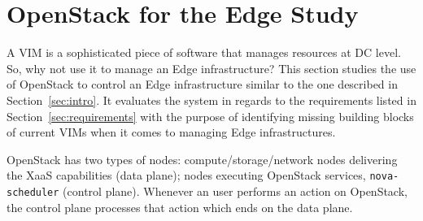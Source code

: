 \section{OpenStack for the Edge Study}
\label{sec:system_design_considerations}
%

%
A VIM is a sophisticated piece of software that manages resources at DC level.
So, why not use it to manage an Edge infrastructure? This
section studies the use of OpenStack to control an Edge infrastructure
similar to the one described in Section~\ref{sec:intro}. 
It evaluates the system in regards to the
requirements listed in Section~\ref{sec:requirements} with
the purpose of identifying missing building blocks of current VIMs
when it comes to managing Edge infrastructures.

OpenStack has two types of nodes: compute/storage/network nodes delivering the XaaS
capabilities %
(\ie data plane); nodes executing OpenStack services, \eg
 \verb|nova-scheduler| (\ie control plane).
Whenever an user performs an action on OpenStack, the control
plane processes that action which ends on the data plane.


